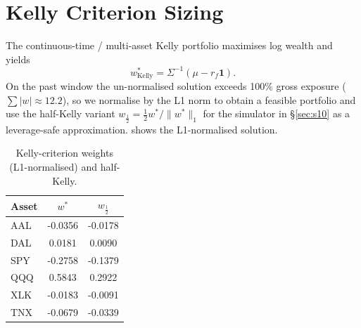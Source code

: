\documentclass[runningheads]{llncs}
\begin{document}
\section{Kelly Criterion Sizing}\label{sec:kelly}
The continuous-time / multi-asset Kelly portfolio
\cite{kelly1956,merton1969} maximises log wealth and yields
\begin{equation}
w^{*}_{\text{Kelly}}=\Sigma^{-1}(\mu-r_{f}\mathbf{1}).
\label{eq:kelly}
\end{equation}
On the past window the un-normalised solution exceeds 100\% gross
exposure ($\sum|w|\approx12.2$), so we normalise by the L1 norm to
obtain a feasible portfolio and use the half-Kelly variant
$w_{\frac{1}{2}}{=}\frac{1}{2}w^{*}/\|w^{*}\|_{1}$ for the simulator
in \S\ref{sec:s10} as a leverage-safe approximation. 
shows the L1-normalised solution.
\begin{table}[!htbp]
\centering\small
\caption{Kelly-criterion weights (L1-normalised) and half-Kelly.}\label{tab:kelly}
\begin{tabular}{lS[round-precision=4]S[round-precision=4]}
\toprule
Asset & {$w^{*}$} & {$w_{\frac{1}{2}}$}\\
\midrule
AAL & -0.0356 & -0.0178\\
DAL &  0.0181 &  0.0090\\
SPY  & -0.2758 & -0.1379\\
QQQ  &  0.5843 &  0.2922\\
XLK  & -0.0183 & -0.0091\\
TNX  & -0.0679 & -0.0339\\
\bottomrule
\end{tabular}
\end{table}

\end{document}
